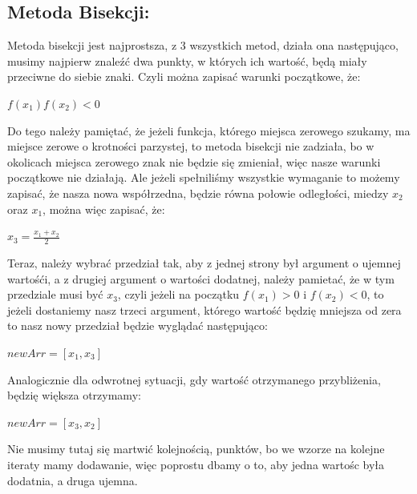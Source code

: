\documentclass[12pt]{article}
\begin{document}
\subsection{Metoda Bisekcji:}
Metoda bisekcji jest najprostsza, z 3 wszystkich metod, działa ona następująco, musimy najpierw znaleźć dwa punkty, w których ich wartość, będą miały przeciwne do siebie znaki. Czyli można zapisać warunki początkowe, że:
\begin{center}
    \begin{math}
        f(x_{1})f(x_{2}) < 0
    \end{math}
\end{center}
Do tego należy pamiętać, że jeżeli funkcja, którego miejsca zerowego szukamy, ma miejsce zerowe o krotności parzystej, to metoda bisekcji nie zadziała, bo w okolicach miejsca zerowego znak nie będzie się zmieniał, więc nasze warunki początkowe nie działają. Ale jeżeli spełniliśmy wszystkie wymaganie to możemy zapisać, że nasza nowa współrzedna, będzie równa połowie odległości, miedzy $x_{2}$ oraz $x_{1}$, można więc zapisać, że:
\begin{center}
    \begin{math}
        x_{3} = \frac{x_{1}+x_{2}}{2}
    \end{math}
\end{center}
Teraz, należy wybrać przedział tak, aby z jednej strony był argument o ujemnej wartośći, a  z drugiej argument o wartości dodatnej, należy pamietać, że w tym przedziale musi być $x_{3}$, czyli jeżeli na początku $f(x_{1})>0$ i $f(x_{2})<0$, to jeżeli dostaniemy nasz trzeci argument, którego wartość  będzię mniejsza od zera to nasz nowy przedział będzie wyglądać następująco:
\begin{center}
    \begin{math}
        newArr = [x_{1},x_{3}]
    \end{math}
\end{center}
Analogicznie dla odwrotnej sytuacji, gdy wartość otrzymanego przybliżenia, będzię większa otrzymamy:
\begin{center}
    \begin{math}
        newArr = [x_{3},x_{2}]
    \end{math}
\end{center}
Nie musimy tutaj się martwić kolejnością, punktów, bo we wzorze na kolejne iteraty mamy dodawanie, więc poprostu dbamy o to, aby jedna wartośc była dodatnia, a druga ujemna.
\end{document}
